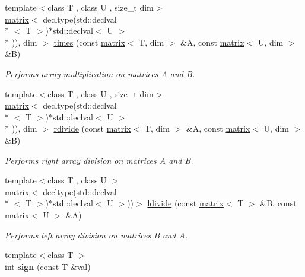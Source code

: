 \begin{DoxyCompactItemize}
\item 
{\footnotesize template$<$class T , class U , size\-\_\-t dim$>$ }\\\hyperlink{classkeycpp_1_1matrix}{matrix}$<$ decltype(std\-::declval\\*
$<$ T $>$)$\ast$std\-::declval$<$ U $>$\\*
)), dim $>$ \hyperlink{namespacekeycpp_a23a0fd48168263aad7f77f1769dc2f2a}{times} (const \hyperlink{classkeycpp_1_1matrix}{matrix}$<$ T, dim $>$ \&A, const \hyperlink{classkeycpp_1_1matrix}{matrix}$<$ U, dim $>$ \&B)
\begin{DoxyCompactList}\small\item\em Performs array multiplication on matrices A and B. \end{DoxyCompactList}\item 
{\footnotesize template$<$class T , class U , size\-\_\-t dim$>$ }\\\hyperlink{classkeycpp_1_1matrix}{matrix}$<$ decltype(std\-::declval\\*
$<$ T $>$)$\ast$std\-::declval$<$ U $>$\\*
)), dim $>$ \hyperlink{namespacekeycpp_a6d379c0b2c9d430f498daae5601f7a79}{rdivide} (const \hyperlink{classkeycpp_1_1matrix}{matrix}$<$ T, dim $>$ \&A, const \hyperlink{classkeycpp_1_1matrix}{matrix}$<$ U, dim $>$ \&B)
\begin{DoxyCompactList}\small\item\em Performs right array division on matrices A and B. \end{DoxyCompactList}\item 
{\footnotesize template$<$class T , class U $>$ }\\\hyperlink{classkeycpp_1_1matrix}{matrix}$<$ decltype(std\-::declval\\*
$<$ T $>$)$\ast$std\-::declval$<$ U $>$))$>$ \hyperlink{namespacekeycpp_ac57d32902cba2c399475015235aeccec}{ldivide} (const \hyperlink{classkeycpp_1_1matrix}{matrix}$<$ T $>$ \&B, const \hyperlink{classkeycpp_1_1matrix}{matrix}$<$ U $>$ \&A)
\begin{DoxyCompactList}\small\item\em Performs left array division on matrices B and A. \end{DoxyCompactList}\item 
\hypertarget{namespacekeycpp_a87f2917e6a7c8e20d010aea0d8480668}{{\footnotesize template$<$class T $>$ }\\int {\bfseries sign} (const T \&val)}\label{namespacekeycpp_a87f2917e6a7c8e20d010aea0d8480668}


\end{DoxyCompactItemize}
